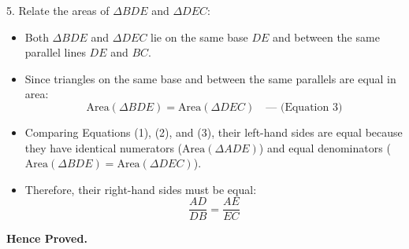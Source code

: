 \begin{enumerate}[label=\thesubsection.\arabic*, ref=\thesubsection.\theenumi]
5. Relate the areas of $\Delta BDE$ and $\Delta DEC$:
   \begin{itemize}
       \item Both $\Delta BDE$ and $\Delta DEC$ lie on the same base $DE$ and between the same parallel lines $DE$ and $BC$.
       \item Since triangles on the same base and between the same parallels are equal in area:
       \[
       \text{Area}(\Delta BDE) = \text{Area}(\Delta DEC) \quad \text{--- (Equation 3)}
       \]
   \end{itemize}


   \begin{itemize}
       \item Comparing Equations (1), (2), and (3), their left-hand sides are equal because they have identical numerators ($\text{Area}(\Delta ADE)$) and equal denominators ($\text{Area}(\Delta BDE) = \text{Area}(\Delta DEC)$).
       \item Therefore, their right-hand sides must be equal:
       \[
       \frac{AD}{DB} = \frac{AE}{EC}
       \]
   \end{itemize}


\textbf{Hence Proved.}



\noindent

\end{enumerate}

